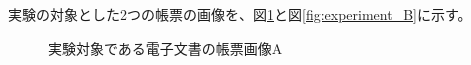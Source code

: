 実験の対象とした2つの帳票の画像を、図\ref{fig:experiment_A}と図\ref{fig:experiment_B}に示す。
\begin{figure}[tp]
    \begin{center}
        \caption{実験対象である電子文書の帳票画像A}
        \label{fig:experiment_A}
    \end{center}
\end{figure}

